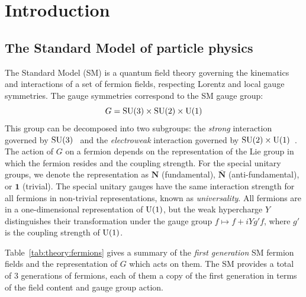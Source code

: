 \chapter{Introduction}
\label{sec:theory}

\section{The Standard Model of particle physics}

The Standard Model (SM) is a quantum field theory governing the kinematics and interactions of a set of fermion fields, respecting Lorentz and local gauge symmetries.
The gauge symmetries correspond to the SM gauge group:
\begin{equation}
 G = \operatorname{\mathrm{SU}}(3) \times \operatorname{\mathrm{SU}}(2) \times \operatorname{\mathrm{U}}(1)
\end{equation}
This group can be decomposed into two subgroups: the \emph{strong} interaction governed by $\operatorname{\mathrm{SU}}(3)$~\cite{qcd1,qcd2} and the \emph{electroweak} interaction governed by $\operatorname{\mathrm{SU}}(2)\times\operatorname{\mathrm{U}}(1)$~\cite{weak1,weak2,weak3}.
The action of $G$ on a fermion depends on the representation of the Lie group in which the fermion resides and the coupling strength.
For the special unitary groups, we denote the representation as $\mathbf{N}$ (fundamental), $\bar{\mathbf{N}}$ (anti-fundamental), or $\mathbf{1}$ (trivial).
The special unitary gauges have the same interaction strength for all fermions in non-trivial representations, known as \emph{universality}.
All fermions are in a one-dimensional representation of $\operatorname{\mathrm{U}}(1)$, but the weak hypercharge $Y$ distinguishes their transformation under the gauge group $f\mapsto f + i Y g' f$, where $g'$ is the coupling strength of $\operatorname{\mathrm{U}}(1)$.

Table~\ref{tab:theory:fermions} gives a summary of the \emph{first generation} SM fermion fields and the representation of $G$ which acts on them.
The SM provides a total of 3 generations of fermions, each of them a copy of the first generation in terms of the field content and gauge group action.


